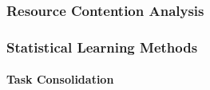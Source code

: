 \subsubsection{Resource Contention Analysis}
\label{sec:resource_contention_analysis}

\subsubsection{Statistical Learning Methods}
\label{sec:evaluation_statistical_learning_methods}


\paragraph{Task Consolidation}
\label{sec:evaluation_task_consolidation}

